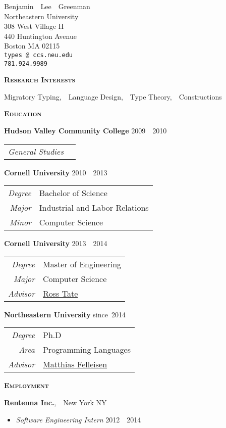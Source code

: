 \documentclass{article}
\makeatletter
\renewcommand{\maketitle}{
\begin{center}
  {\large{Benjamin~~Lee~~Greenman}}
\vspace{0.1cm}
\\Northeastern University
\\308 West Village H
\\440 Huntington Avenue
\\Boston MA 02115
\\\texttt{types\,@\,ccs.neu.edu}
\\\texttt{781.924.9989}
\end{center}
}
\newcommand{\mysection}[1]{\vspace{0.5cm} \noindent\textsc{\textbf{#1}}~\hrulefill}
\newcommand{\mysubsection}[1]{\noindent\textbf{#1}}
\newcommand{\datespan}[2]{#1~\textendash{}~#2}
\newcommand{\datesince}[1]{since~#1}
\makeatother
\begin{document}
\maketitle


\mysection{Research Interests}

Migratory Typing,~~Language Design,~~Type Theory,~~Constructions

\mysection{Education}

\mysubsection{Hudson Valley Community College} \hfill \datespan{2009}{2010}\\
\begin{tabular}{>{\it}r l}
General Studies & \\
\end{tabular}

\mysubsection{Cornell University} \hfill \datespan{2010}{2013}\\
\begin{tabular}{>{\it}r l}
Degree & Bachelor of Science\\
Major & Industrial and Labor Relations\\
Minor & Computer Science\\
\end{tabular}

\mysubsection{Cornell University} \hfill \datespan{2013}{2014}\\
\begin{tabular}{>{\it}r l}
Degree & Master of Engineering\\
Major & Computer Science\\
Advisor & \href{http://www.cs.cornell.edu/~ross/}{Ross Tate}
\end{tabular}

\mysubsection{Northeastern University} \hfill \datesince{2014}\\
\begin{tabular}{>{\it}r l}
Degree & Ph.D \\
Area & Programming Languages \\
Advisor & \href{http://ccs.neu.edu/home/matthias}{Matthias Felleisen}
\end{tabular}


\mysection{Employment}

\mysubsection{Rentenna Inc.},~~New York NY
\begin{itemize}
  \item \emph{Software Engineering Intern} \hfill \datespan{2012}{2014}
\end{itemize}
\end{document}
